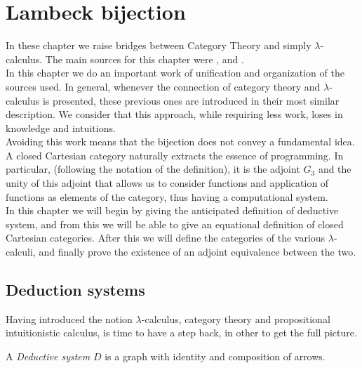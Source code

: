 
\chapter{Lambeck bijection}
\label{chap:4}
\thispagestyle{empty}
In these chapter we raise bridges between Category Theory and simply $\lambda$-calculus. The main sources for this chapter were  \cite{lambek1988introduction}, \cite{lambek1985cartesian} and \cite[Chapter 6]{selinger2008lecture}.\\

In this chapter we do an important work of unification and organization of the sources used. In general, whenever the connection of category theory and $\lambda$-calculus is presented, these previous ones are introduced in their most similar description. We consider that this approach, while requiring less work, loses in knowledge and intuitions.\\


Avoiding this work means that the bijection does not convey a fundamental idea. A closed Cartesian category naturally extracts the essence of programming. In particular, (following the notation of the definition), it is the adjoint $G_3$ and the unity of this adjoint that allows us to consider functions and application of functions as elements of the category, thus having a computational system.\\

In this chapter we will begin by giving the anticipated definition of deductive system, and from this we will be able to give an equational definition of closed Cartesian categories.  After this we will define the categories of the various $\lambda$-calculi, and finally prove the existence of an adjoint equivalence between the two.\\



\section{Deduction systems}
Having introduced the notion $\lambda$-calculus, category theory and propositional intuitionistic calculus, is time to have a step back, in other to get the full picture.

\begin{definition}
  A \emph{Deductive system} $D$ is a graph  with identity and composition of arrows.
\end{definition}


